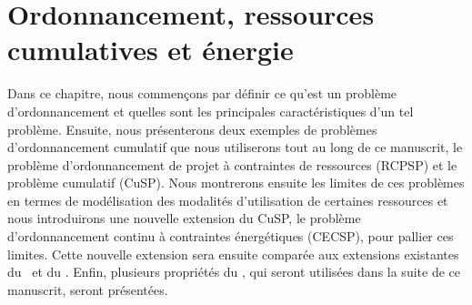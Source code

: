 

\chapter{Ordonnancement, ressources cumulatives et énergie}

Dans ce chapitre, nous commençons par définir ce qu'est un problème
d'ordonnancement et quelles sont les principales caractéristiques d'un
tel problème. Ensuite, nous présenterons deux exemples de problèmes
d'ordonnancement cumulatif que nous utiliserons tout au long de ce
manuscrit, le problème d'ordonnancement de projet à contraintes de
ressources (RCPSP) et le problème cumulatif (CuSP). Nous montrerons
ensuite les limites de ces problèmes en termes de modélisation des
modalités d'utilisation de certaines ressources et nous introduirons une nouvelle 
extension du CuSP, le problème d'ordonnancement continu à contraintes
énergétiques (CECSP), pour pallier ces limites. Cette nouvelle
extension sera ensuite comparée aux extensions existantes du \RCPSP~et
du \CUSP.  Enfin, plusieurs propriétés du \CECSP, qui seront utilisées
dans la suite de ce manuscrit, seront présentées.





